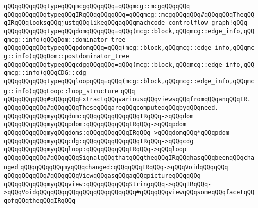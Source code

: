 \verb|qQQqqQQqqQQqtypeqQQqmcgqQQqqQQq=qQQqmcg::mcgqQQqqQQq|\newline
\verb|qQQqqQQqqQQqtypeqQQqIRqQQqqQQqqQQq=qQQqmcg::mcgqQQqqQQq#qQQqqQQqTheqQQqIRqQQqlooksqQQqjustqQQqlikeqQQqaqQQqmachcode_controlflow_graph!qQQq|\newline
\verb|qQQqqQQqqQQqtypeqQQqdomqQQqqQQq=qQQq(mcg::block,qQQqmcg::edge_info,qQQqmcg::info)qQQqDom::dominator_tree|\newline
\verb|qQQqqQQqqQQqtypeqQQqpdomqQQq=qQQq(mcg::block,qQQqmcg::edge_info,qQQqmcg::info)qQQqDom::postdominator_tree|\newline
\verb|qQQqqQQqqQQqtypeqQQqcdgqQQqqQQq=qQQq(mcg::block,qQQqmcg::edge_info,qQQqmcg::info)qQQqCDG::cdg|\newline
\verb|qQQqqQQqqQQqtypeqQQqloopqQQq=qQQq(mcg::block,qQQqmcg::edge_info,qQQqmcg::info)qQQqLoop::loop_structure|\newline
\verb|qQQq|\newline
\newline
\verb|qQQqqQQqqQQq#qQQqqQQqExtractqQQqvariousqQQqviewsqQQqfromqQQqanqQQqIR.|\newline
\verb|qQQqqQQqqQQq#qQQqqQQqTheseqQQqareqQQqcomputedqQQqbyqQQqneed.|\newline
\newline
\verb|qQQqqQQqqQQqmyqQQqdom:qQQqqQQqqQQqqQQqIRqQQq->qQQqdom|\newline
\verb|qQQqqQQqqQQqmyqQQqpdom:qQQqqQQqqQQqIRqQQq->qQQqpdom|\newline
\verb|qQQqqQQqqQQqmyqQQqdoms:qQQqqQQqqQQqIRqQQq->qQQqdomqQQq*qQQqpdom|\newline
\verb|qQQqqQQqqQQqmyqQQqcdg:qQQqqQQqqQQqqQQqIRqQQq->qQQqcdg|\newline
\verb|qQQqqQQqqQQqmyqQQqloop:qQQqqQQqqQQqIRqQQq->qQQqloop|\newline
\newline
\newline
\verb|qQQqqQQqqQQq#qQQqqQQqSignalqQQqthatqQQqtheqQQqIRqQQqhasqQQqbeenqQQqchanged|\newline
\newline
\verb|qQQqqQQqqQQqmyqQQqchanged:qQQqqQQqIRqQQq->qQQqVoidqQQqqQQq|\newline
\newline
\newline
\verb|qQQqqQQqqQQq#qQQqqQQqViewqQQqasqQQqaqQQqpictureqQQqqQQq|\newline
\newline
\verb|qQQqqQQqqQQqmyqQQqview:qQQqqQQqqQQqStringqQQq->qQQqIRqQQq->qQQqVoidqQQqqQQqqQQqqQQqqQQqqQQqqQQq#qQQqqQQqviewqQQqsomeqQQqfacetqQQqofqQQqtheqQQqIRqQQq|\newline
